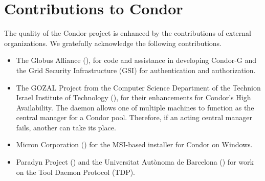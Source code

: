 \section{\label{sec:contributions}Contributions to Condor}

The quality of the Condor project is enhanced by the contributions
of external organizations.
We gratefully acknowledge the following contributions. 

\begin{itemize}

\item{The Globus Alliance} (), 
for code and assistance in developing Condor-G
and the Grid Security Infrastructure (GSI)
for authentication and authorization. 

\item{The GOZAL Project}
from the Computer Science Department
of the Technion Israel Institute of Technology
(),
for their enhancements for Condor's High Availability.
The  daemon allows one of multiple machines to function
as the central manager for a Condor pool.
Therefore, if an acting central manager fails,
another can take its place.


\item{Micron Corporation} ()
for the MSI-based installer for Condor on Windows.

\item{Paradyn Project} ()
and the Universitat Aut\`{o}noma de Barcelona
() for work on the Tool Daemon Protocol (TDP).

\end{itemize}
